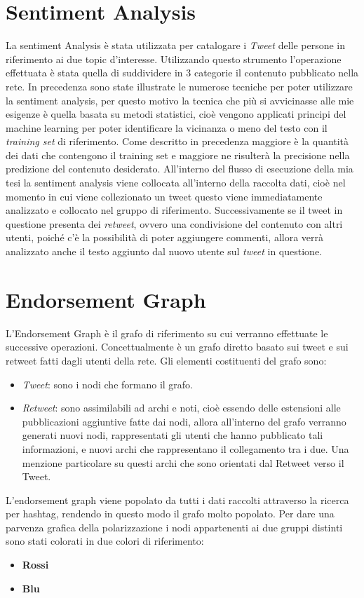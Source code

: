 \section{Sentiment Analysis}
La sentiment Analysis è stata utilizzata per catalogare i \textit{Tweet} delle persone in riferimento ai due topic d'interesse. 
Utilizzando questo strumento l'operazione effettuata è stata quella di suddividere in 3 categorie il contenuto pubblicato nella rete. In precedenza sono state illustrate le numerose tecniche per poter utilizzare la sentiment analysis, per questo motivo la tecnica che più si avvicinasse alle mie esigenze è quella basata su metodi statistici, cioè vengono applicati principi del machine learning per poter identificare la vicinanza o meno del testo con il \textit{training set} di riferimento. 
Come descritto in precedenza maggiore è la quantità dei dati che contengono il training set e maggiore ne risulterà la precisione nella predizione del contenuto desiderato.
All'interno del flusso di esecuzione della mia tesi la sentiment analysis viene collocata all'interno della raccolta dati, cioè nel momento in cui viene collezionato un tweet questo viene immediatamente analizzato e collocato nel gruppo di riferimento.
Successivamente se il tweet in questione presenta dei \textit{retweet}, ovvero una condivisione del contenuto con altri utenti, poiché c'è la possibilità di poter aggiungere commenti, allora verrà analizzato anche il testo aggiunto dal nuovo utente sul \textit{tweet} in questione.

\section{Endorsement Graph}
L'Endorsement Graph è il grafo di riferimento su cui verranno effettuate le successive operazioni. Concettualmente è un grafo diretto basato sui tweet e sui retweet fatti dagli utenti della rete.
Gli elementi costituenti del grafo sono:
\begin{itemize}
\item \textit{Tweet}: sono i nodi che formano il grafo.
\item \textit{Retweet}: sono assimilabili ad archi e noti, cioè essendo delle estensioni alle pubblicazioni aggiuntive fatte dai nodi, allora all'interno del grafo verranno generati nuovi nodi, rappresentati gli utenti che hanno pubblicato tali informazioni, e nuovi archi che rappresentano il collegamento tra i due. Una menzione particolare su questi archi che sono orientati dal Retweet verso il Tweet. 
\end{itemize}
L'endorsement graph viene popolato da tutti i dati raccolti attraverso la ricerca per hashtag, rendendo in questo modo il grafo molto popolato. 
Per dare una parvenza grafica della polarizzazione i nodi appartenenti ai due gruppi distinti sono stati colorati in due colori di riferimento:
\begin{itemize}
\item \textbf{Rossi}
\item \textbf{Blu}
\end{itemize}
